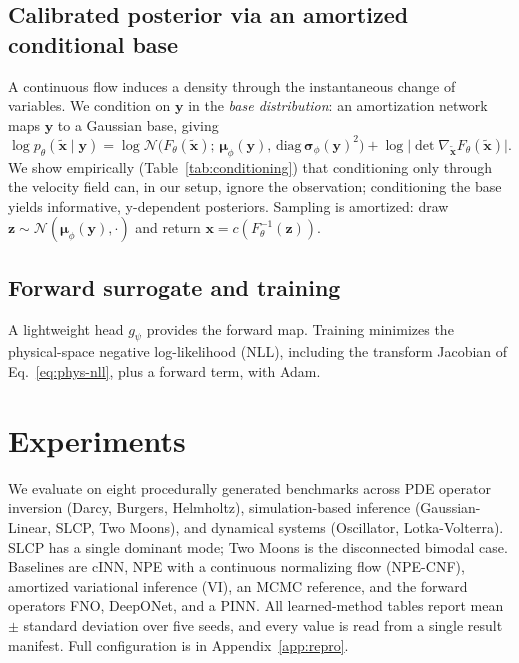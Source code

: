 \documentclass{article}
\begin{document}
\subsection{Calibrated posterior via an amortized conditional base}
A continuous flow induces a density through the instantaneous change of variables.
We condition on $\mathbf{y}$ in the \emph{base distribution}: an amortization
network maps $\mathbf{y}$ to a Gaussian base, giving
\begin{equation}
\log p_\theta(\tilde{\mathbf{x}}\mid\mathbf{y})=\log\mathcal{N}\!\big(F_\theta(\tilde{\mathbf{x}});\,\boldsymbol{\mu}_\phi(\mathbf{y}),\,\mathrm{diag}\,\boldsymbol{\sigma}_\phi(\mathbf{y})^2\big)+\log\big|\det\nabla_{\tilde{\mathbf{x}}}F_\theta(\tilde{\mathbf{x}})\big|.
\label{eq:cond}
\end{equation}
We show empirically (Table~\ref{tab:conditioning}) that conditioning only through
the velocity field can, in our setup, ignore the observation; conditioning the base
yields informative, y-dependent posteriors. Sampling is amortized: draw
$\mathbf{z}\sim\mathcal{N}(\boldsymbol{\mu}_\phi(\mathbf{y}),\cdot)$ and return
$\mathbf{x}=c(F_\theta^{-1}(\mathbf{z}))$.

\subsection{Forward surrogate and training}
A lightweight head $g_\psi$ provides the forward map. Training minimizes the
physical-space negative log-likelihood (NLL), including the transform Jacobian of
Eq.~\eqref{eq:phys-nll}, plus a forward term, with Adam.

\section{Experiments}
\label{sec:experiments}
We evaluate on eight procedurally generated benchmarks across PDE operator
inversion (Darcy, Burgers, Helmholtz), simulation-based inference (Gaussian-Linear,
SLCP, Two Moons), and dynamical systems (Oscillator, Lotka-Volterra). SLCP has a
single dominant mode; Two Moons is the disconnected bimodal case. Baselines are
cINN, NPE with a continuous normalizing flow (NPE-CNF), amortized variational
inference (VI), an MCMC reference, and the forward operators FNO, DeepONet, and a
PINN. All learned-method tables report mean $\pm$ standard deviation over five
seeds, and every value is read from a single result manifest. Full configuration
is in Appendix~\ref{app:repro}.
\end{document}
